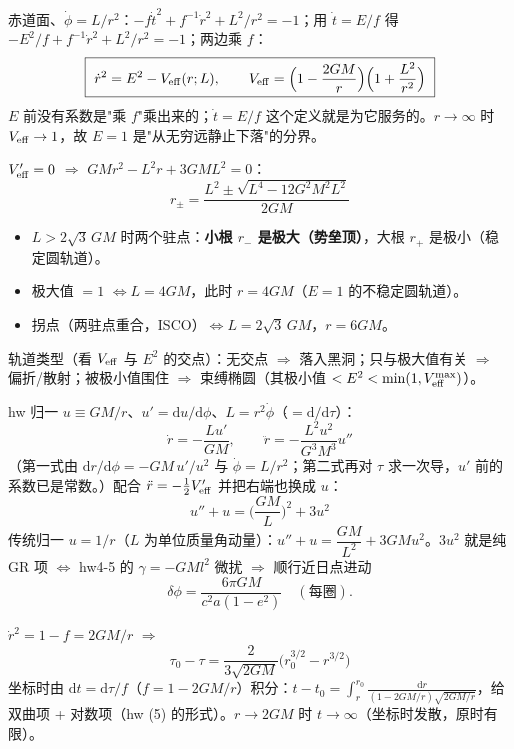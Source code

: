 \documentclass[9pt,a4paper]{ctexart}
\newcommand{\hd}[1]{\vspace{2pt}{\bfseries #1}\par}
\newcommand{\dd}{\mathrm{d}}
\newcommand{\Veff}{V_{\rm eff}}
\begin{document}
\begin{multicols}{2}
\hd{有效势（(c)：从 $-1$ 乘 $f$ 四行）}
赤道面、$\dot\phi=L/r^2$：$-f\dot t^2+f^{-1}\dot r^2+L^2/r^2=-1$；用 $\dot t=E/f$ 得 $-E^2/f+f^{-1}\dot r^2+L^2/r^2=-1$；两边乘 $f$：
$$\boxed{\ \dot r^2=E^2-\Veff(r;L),\qquad \Veff=\Big(1-\frac{2GM}{r}\Big)\Big(1+\frac{L^2}{r^2}\Big)\ }$$
$E$ 前没有系数是"乘 $f$"乘出来的；$\dot t=E/f$ 这个定义就是为它服务的。$r\to\infty$ 时 $\Veff\to1$，故 $E=1$ 是"从无穷远静止下落"的分界。

\hd{驻点、光子球、ISCO（(2) 的答案）}
$\Veff'=0$ $\Rightarrow$ $GM r^2-L^2r+3GML^2=0$：
$$r_\pm=\frac{L^2\pm\sqrt{L^4-12G^2M^2L^2}}{2GM}$$
\begin{itemize}
\item $L>2\sqrt3\,GM$ 时两个驻点：\textbf{小根 $r_-$ 是极大（势垒顶）}，大根 $r_+$ 是极小（稳定圆轨道）。
\item 极大值 $=1$ $\iff L=4GM$，此时 $r=4GM$（$E=1$ 的不稳定圆轨道）。
\item 拐点（两驻点重合，ISCO）$\iff L=2\sqrt3\,GM$，$r=6GM$。
\end{itemize}
轨道类型（看 $\Veff$ 与 $E^2$ 的交点）：无交点 $\Rightarrow$ 落入黑洞；只与极大值有关 $\Rightarrow$ 偏折/散射；被极小值围住 $\Rightarrow$ 束缚椭圆（其极小值 $<E^2<\min(1,\Veff^{\max})$）。

\hd{GR 比内方程（(3)）}
hw 归一 $u\equiv GM/r$、$u'=\dd u/\dd\phi$、$L=r^2\dot\phi$（$\dot{}=\dd/\dd\tau$）：
$$\dot r=-\frac{L u'}{GM},\qquad \ddot r=-\frac{L^2u^2}{G^3M^3}u''$$
（第一式由 $\dd r/\dd\phi=-GM\,u'/u^2$ 与 $\dot\phi=L/r^2$；第二式再对 $\tau$ 求一次导，$u'$ 前的系数已是常数。）配合 $\ddot r=-\tfrac12\Veff'$ 并把右端也换成 $u$：
$$\boxed{\ u''+u=\Big(\frac{GM}{L}\Big)^2+3u^2\ }$$
传统归一 $u=1/r$（$L$ 为单位质量角动量）：$u''+u=\dfrac{GM}{L^2}+3GM u^2$。$3u^2$ 就是纯 GR 项 $\Leftrightarrow$ hw4-5 的 $\gamma=-GMl^2$ 微扰 $\Rightarrow$ 顺行近日点进动
$$\delta\phi=\frac{6\pi GM}{c^2a(1-e^2)}\quad(\text{每圈}).$$

\hd{自由落体 $E=1$、$L=0$（选做）}
$\dot r^2=1-f=2GM/r$ $\Rightarrow$
$$\tau_0-\tau=\frac{2}{3\sqrt{2GM}}\big(r_0^{3/2}-r^{3/2}\big)$$
坐标时由 $\dd t=\dd\tau/f$（$f=1-2GM/r$）积分：$t-t_0=\int_r^{r_0}\frac{\dd r}{(1-2GM/r)\sqrt{2GM/r}}$，给双曲项 + 对数项（hw (5) 的形式）。$r\to2GM$ 时 $t\to\infty$（坐标时发散，原时有限）。


\end{multicols}
\end{document}
